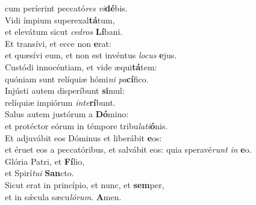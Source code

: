 \evenverse cum períerint peccató\textit{res} \textit{vi}\textbf{dé}bis.\\
\oddverse Vidi ímpium superexal\textbf{tá}tum,~\*\\
\oddverse et elevátum sicut \textit{ce}\textit{dros} \textbf{Lí}bani.\\
\evenverse Et transívi, et ecce non \textbf{e}rat:~\*\\
\evenverse et quæsívi eum, et non est invéntus \textit{lo}\textit{cus} \textbf{e}jus.\\
\oddverse Custódi innocéntiam, et vide æqui\textbf{tá}tem:~\*\\
\oddverse quóniam sunt relíquiæ hómi\textit{ni} \textit{pa}\textbf{cí}fico.\\
\evenverse Injústi autem disperíbunt \textbf{si}mul:~\*\\
\evenverse relíquiæ impiórum \textit{in}\textit{te}\textbf{rí}bunt.\\
\oddverse Salus autem justórum a \textbf{Dó}mino:~\*\\
\oddverse et protéctor eórum in témpore tribu\textit{la}\textit{ti}\textbf{ó}nis.\\
\evenverse Et adjuvábit eos Dóminus et liberábit \textbf{e}os:~\*\\
\evenverse et éruet eos a peccatóribus, et salvábit eos: quia speravé\textit{runt} \textit{in} \textbf{e}o.\\
\oddverse Glória Patri, et \textbf{Fí}lio,~\*\\
\oddverse et Spirí\textit{tu}\textit{i} \textbf{San}cto.\\
\evenverse Sicut erat in princípio, et nunc, et \textbf{sem}per,~\*\\
\evenverse et in sǽcula sæcu\textit{ló}\textit{rum}. \textbf{A}men.\\
